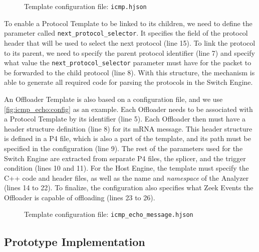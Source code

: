 \begin{figure}[htb]
    \caption{Template configuration file: \texttt{icmp.hjson}}
    \begin{center}
        
    \end{center}
    \label{fig:icmp_template:config}
\end{figure}

To enable a Protocol Template to be linked to its children, we need to define the parameter called \texttt{next\_protocol\_selector}. It specifies the field of the protocol header that will be used to select the next protocol (line 15). To link the protocol to its parent, we need to specify the parent protocol identifier (line 7) and specify what value the \texttt{next\_protocol\_selector} parameter must have for the packet to be forwarded to the child protocol (line 8). With this structure, the mechanism is able to generate all required code for parsing the protocols in the Switch Engine.

An Offloader Template is also based on a configuration file, and we use \autoref{fig:icmp_echo:config} as an example. Each Offloader needs to be associated with a Protocol Template by its identifier (line 5). Each Offloader then must have a header structure definition (line 8) for its mRNA message. This header structure is defined in a P4 file, which is also a part of the template, and its path must be specified in the configuration (line 9). The rest of the parameters used for the Switch Engine are extracted from separate P4 files, the splicer, and the trigger condition (lines 10 and 11). For the Host Engine, the template must specify the C++ code and header files, as well as the name and \textit{namespace} of the Analyzer (lines 14 to 22). To finalize, the configuration also specifies what Zeek Events the Offloader is capable of offloading (lines 23 to 26).

\begin{figure}[htb]
    \caption{Template configuration file: \texttt{icmp\_echo\_message.hjson}}
    \begin{center}
        
    \end{center}
    \label{fig:icmp_echo:config}
\end{figure}

\subsection{Prototype Implementation}

